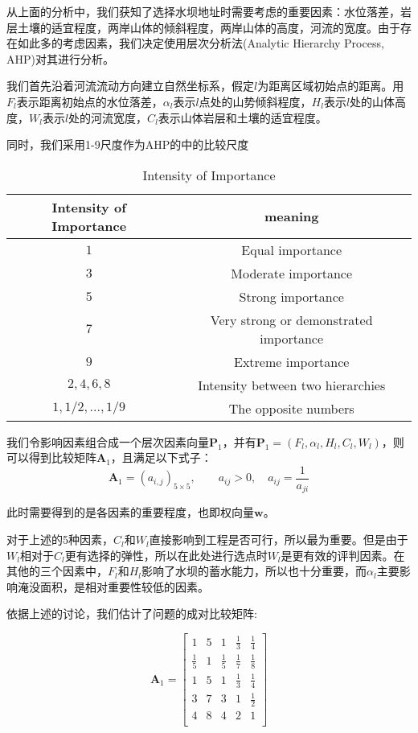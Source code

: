 \documentclass[nocover]{cumcmart}
\begin{document}
从上面的分析中，我们获知了选择水坝地址时需要考虑的重要因素：水位落差，岩层土壤的适宜程度，两岸山体的倾斜程度，两岸山体的高度，河流的宽度。由于存在如此多的考虑因素，我们决定使用层次分析法(Analytic Hierarchy Process, AHP)对其进行分析。

我们首先沿着河流流动方向建立自然坐标系，假定$l$为距离区域初始点的距离。用$F_{l}$表示距离初始点的水位落差，$\alpha_{l}$表示$l$点处的山势倾斜程度，$H_{l}$表示$l$处的山体高度，$W_{l}$表示$l$处的河流宽度，$C_{l}$表示山体岩层和土壤的适宜程度。

同时，我们采用1-9尺度作为AHP的中的比较尺度
\begin{table}[!ht]
\centering
  \begin{tabular}{cc}
  \hline
   Intensity of Importance & meaning  \\
  \hline
  $1$ & Equal importance \\
  $3$ & Moderate importance \\
  $5$ & Strong importance \\
  $7$ & Very strong or demonstrated importance \\
  $9$ & Extreme importance \\
  $2,4,6,8$ & Intensity between two hierarchies \\
  $1,1/2,...,1/9$ & The opposite numbers\\
  \hline
  \end{tabular}
  \caption{Intensity of Importance}
\end{table}

我们令影响因素组合成一个层次因素向量$\textbf{P}_1$，并有$\textbf{P}_1 = (F_{l}, \alpha_{l}, H_{l}, C_{l}, W_{l})$，则可以得到比较矩阵$\textbf{A}_1$，且满足以下式子：
\begin{equation}
\textbf{A}_1 = (a_{i,j})_{5\times5},\qquad a_{ij} > 0, \quad a_{ij} = \frac{1}{a_{ji}}
\end{equation}

此时需要得到的是各因素的重要程度，也即权向量$\textbf{w}$。

对于上述的5种因素，$C_{l}$和$W_{l}$直接影响到工程是否可行，所以最为重要。但是由于$W_{l}$相对于$C_{l}$更有选择的弹性，所以在此处进行选点时$W_{l}$是更有效的评判因素。在其他的三个因素中，$F_{l}$和$H_{l}$影响了水坝的蓄水能力，所以也十分重要，而$\alpha_{l}$主要影响淹没面积，是相对重要性较低的因素。

依据上述的讨论，我们估计了问题的成对比较矩阵:

\[\textbf{A}_1 =
\left[
\begin{matrix}
1 & 5 & 1 & \frac{1}{3} & \frac{1}{4} \\
\frac{1}{5}  & 1 & \frac{1}{5} & \frac{1}{7} & \frac{1}{8} \\
1 & 5 & 1 & \frac{1}{3} & \frac{1}{4} \\
3 & 7 & 3 & 1 & \frac{1}{2} \\
4 & 8 & 4 & 2 & 1 \\
\end{matrix}
\right]
\]
\end{document}
